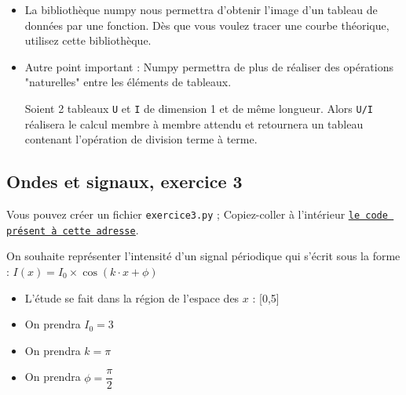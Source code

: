 \documentclass[11pt]{article}
\begin{document}
\begin{enumerate}
    \begin{itemize}
     \item La bibliothèque numpy nous permettra d'obtenir l'image d'un tableau de données par une fonction. Dès que vous voulez tracer une courbe théorique, utilisez cette bibliothèque. 
     \item Autre point important : Numpy permettra de plus de réaliser des opérations "naturelles" entre les éléments de tableaux. 
     
     Soient 2 tableaux \texttt{U} et \texttt{I} de dimension 1 et de même longueur. Alors \texttt{U/I} réalisera le calcul membre à membre attendu et retournera un tableau contenant l'opération de division terme à terme.
    \end{itemize}

    
    
    

 
 
\end{enumerate}



\subsection{Ondes et signaux, exercice 3}






\bigskip




Vous pouvez créer un fichier \texttt{exercice3.py} ; Copiez-coller à l'intérieur \href{https://github.com/formationPythonPC-Juin/aides-formation/blob/master/exercice3-aide.py}{\underline{\texttt{le code présent à cette adresse}}}. 











On souhaite représenter l'intensité d'un signal périodique qui s'écrit sous la forme : $I(x) = I_0\times \cos (k\cdot x + \phi )$


\begin{itemize}
 \item L'étude se fait dans la région de l'espace des $x$ : [0,5]
 \item On prendra $I_0 = 3$
 \item On prendra $k = \pi$
 \item  On prendra $\phi = \dfrac{\pi}{2}$
\end{itemize}
\end{document}

